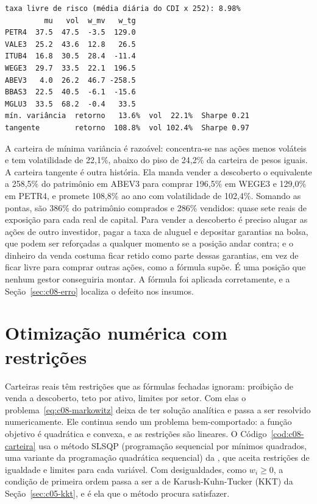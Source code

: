
\begin{lstlisting}[style=saida]
taxa livre de risco (média diária do CDI x 252): 8.98%
         mu   vol  w_mv   w_tg
PETR4  37.5  47.5  -3.5  129.0
VALE3  25.2  43.6  12.8   26.5
ITUB4  16.8  30.5  28.4  -11.4
WEGE3  29.7  33.5  22.1  196.5
ABEV3   4.0  26.2  46.7 -258.5
BBAS3  22.5  40.5  -6.1  -15.6
MGLU3  33.5  68.2  -0.4   33.5
mín. variância  retorno   13.6%  vol  22.1%  Sharpe 0.21
tangente        retorno  108.8%  vol 102.4%  Sharpe 0.97
\end{lstlisting}

A carteira de mínima variância é razoável: concentra-se nas ações menos voláteis e tem volatilidade de 22,1\%, abaixo do piso de 24,2\% da carteira de pesos iguais. A carteira tangente é outra história. Ela manda vender a descoberto o equivalente a 258,5\% do patrimônio em ABEV3 para comprar 196,5\% em WEGE3 e 129,0\% em PETR4, e promete 108,8\% ao ano com volatilidade de 102,4\%. Somando as pontas, são 386\% do patrimônio comprados e 286\% vendidos: quase sete reais de exposição para cada real de capital. Para vender a descoberto é preciso alugar as ações de outro investidor, pagar a taxa de aluguel e depositar garantias na bolsa, que podem ser reforçadas a qualquer momento se a posição andar contra; e o dinheiro da venda costuma ficar retido como parte dessas garantias, em vez de ficar livre para comprar outras ações, como a fórmula supõe. É uma posição que nenhum gestor conseguiria montar. A fórmula foi aplicada corretamente, e a Seção~\ref{sec:c08-erro} localiza o defeito nos insumos.

\section{Otimização numérica com restrições}
\label{sec:c08-numerica}

Carteiras reais têm restrições que as fórmulas fechadas ignoram: proibição de venda a descoberto, teto por ativo, limites por setor. Com elas o problema~\eqref{eq:c08-markowitz} deixa de ter solução analítica e passa a ser resolvido numericamente. Ele continua sendo um problema bem-comportado: a função objetivo é quadrática e convexa, e as restrições são lineares. O Código~\ref{cod:c08-carteira} usa o método SLSQP (programação sequencial por mínimos quadrados, uma variante da programação quadrática sequencial) da , que aceita restrições de igualdade e limites para cada variável. Com desigualdades, como $w_i \ge 0$, a condição de primeira ordem passa a ser a de Karush-Kuhn-Tucker (KKT) da Seção~\ref{sec:c05-kkt}, e é ela que o método procura satisfazer.


